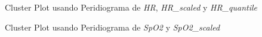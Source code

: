 \begin{figure}[H]
    \centering
    \caption{Cluster Plot usando Peridiograma de \textit{HR}, \textit{HR\_scaled} y \textit{HR\_quantile}}
    \label{fig:per_pc_fc}
\end{figure}

\begin{figure}[ht]
    \centering
    \hfill
    \caption{Cluster Plot usando Peridiograma de \textit{SpO2} y \textit{SpO2\_scaled}}\label{fig:per_pc_spo2}
\end{figure}


